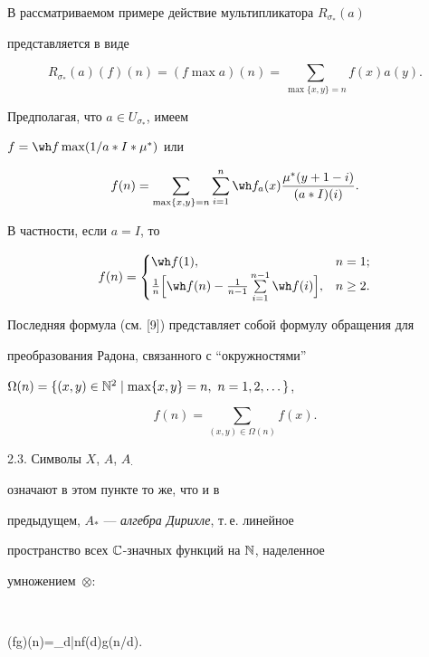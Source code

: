 В рассматриваемом примере действие мультипликатора $R_{\sigma_*}(a)$ 


представляется в виде 


$$ 


R_{\sigma_*}(a)(f)(n)=(f\max a)(n)= 


\sum_{\max\{x,y\}=n}f(x)a(y). 


$$ 


Предполагая, что $a\in U_{\sigma_*}$, имеем 


$f=\wh f\max(1/a*I*\mu^*)$ или 


$$ 


f(n)=\sum_{\max\{x,y\}=n}\sum^n_{i=1} 


\wh f_a(x)\frac{\mu^*(y+1-i)}{(a*I)(i)}. 


$$ 


В частности, если $a=I$, то 


$$ 


f(n)= 


\begin{cases} 


\wh f(1), & n=1;\\


\frac{1}{n}\Big[\wh f(n)-\frac{1}{n-1}


\sum\limits^{n-1}_{i=1}\wh f(i)\Big], & n\ge2. 


\end{cases} 


$$ 


Последняя формула (см. [9]) представляет собой формулу обращения для 


преобразования Радона, связанного с ``окружностями'' 


$\Omega(n)=\{(x,y)\in\Bbb N^2\mid\max\{x,y\}=n,\ n=1,2,\dotsc\}$, 


$$ 


f(n)=\sum_{(x,y)\in\Omega(n)}f(x). 


$$ 


 


2.3. Символы $X$, $A$, $A_{\displaystyle\cdot}$


означают в этом пункте то же, что и в 


предыдущем, $A_*$ --- {\it алгебра Дирихле}, т.\,е. линейное 


пространство всех $\Bbb C$-значных функций на $\Bbb N$, наделенное 


умножением~$\otimes$: 


$$ 


(f\otimes g)(n)=\sum_{d|n}f(d)g(n/d). 


